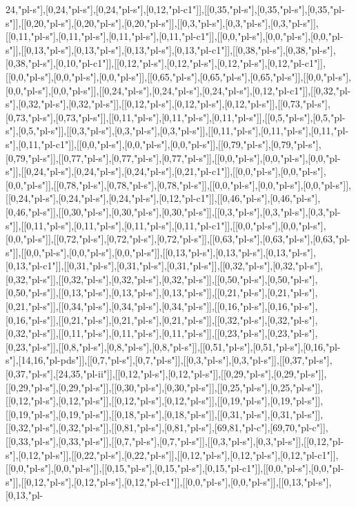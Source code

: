 24,"pl-s"],[0,24,"pl-s"],[0,24,"pl-s"],[0,12,"pl-c1"]],[[0,35,"pl-s"],[0,35,"pl-s"],[0,35,"pl-s"]],[[0,20,"pl-s"],[0,20,"pl-s"],[0,20,"pl-s"]],[[0,3,"pl-s"],[0,3,"pl-s"],[0,3,"pl-s"]],[[0,11,"pl-s"],[0,11,"pl-s"],[0,11,"pl-s"],[0,11,"pl-c1"]],[[0,0,"pl-s"],[0,0,"pl-s"],[0,0,"pl-s"]],[[0,13,"pl-s"],[0,13,"pl-s"],[0,13,"pl-s"],[0,13,"pl-c1"]],[[0,38,"pl-s"],[0,38,"pl-s"],[0,38,"pl-s"],[0,10,"pl-c1"]],[[0,12,"pl-s"],[0,12,"pl-s"],[0,12,"pl-s"],[0,12,"pl-c1"]],[[0,0,"pl-s"],[0,0,"pl-s"],[0,0,"pl-s"]],[[0,65,"pl-s"],[0,65,"pl-s"],[0,65,"pl-s"]],[[0,0,"pl-s"],[0,0,"pl-s"],[0,0,"pl-s"]],[[0,24,"pl-s"],[0,24,"pl-s"],[0,24,"pl-s"],[0,12,"pl-c1"]],[[0,32,"pl-s"],[0,32,"pl-s"],[0,32,"pl-s"]],[[0,12,"pl-s"],[0,12,"pl-s"],[0,12,"pl-s"]],[[0,73,"pl-s"],[0,73,"pl-s"],[0,73,"pl-s"]],[[0,11,"pl-s"],[0,11,"pl-s"],[0,11,"pl-s"]],[[0,5,"pl-s"],[0,5,"pl-s"],[0,5,"pl-s"]],[[0,3,"pl-s"],[0,3,"pl-s"],[0,3,"pl-s"]],[[0,11,"pl-s"],[0,11,"pl-s"],[0,11,"pl-s"],[0,11,"pl-c1"]],[[0,0,"pl-s"],[0,0,"pl-s"],[0,0,"pl-s"]],[[0,79,"pl-s"],[0,79,"pl-s"],[0,79,"pl-s"]],[[0,77,"pl-s"],[0,77,"pl-s"],[0,77,"pl-s"]],[[0,0,"pl-s"],[0,0,"pl-s"],[0,0,"pl-s"]],[[0,24,"pl-s"],[0,24,"pl-s"],[0,24,"pl-s"],[0,21,"pl-c1"]],[[0,0,"pl-s"],[0,0,"pl-s"],[0,0,"pl-s"]],[[0,78,"pl-s"],[0,78,"pl-s"],[0,78,"pl-s"]],[[0,0,"pl-s"],[0,0,"pl-s"],[0,0,"pl-s"]],[[0,24,"pl-s"],[0,24,"pl-s"],[0,24,"pl-s"],[0,12,"pl-c1"]],[[0,46,"pl-s"],[0,46,"pl-s"],[0,46,"pl-s"]],[[0,30,"pl-s"],[0,30,"pl-s"],[0,30,"pl-s"]],[[0,3,"pl-s"],[0,3,"pl-s"],[0,3,"pl-s"]],[[0,11,"pl-s"],[0,11,"pl-s"],[0,11,"pl-s"],[0,11,"pl-c1"]],[[0,0,"pl-s"],[0,0,"pl-s"],[0,0,"pl-s"]],[[0,72,"pl-s"],[0,72,"pl-s"],[0,72,"pl-s"]],[[0,63,"pl-s"],[0,63,"pl-s"],[0,63,"pl-s"]],[[0,0,"pl-s"],[0,0,"pl-s"],[0,0,"pl-s"]],[[0,13,"pl-s"],[0,13,"pl-s"],[0,13,"pl-s"],[0,13,"pl-c1"]],[[0,31,"pl-s"],[0,31,"pl-s"],[0,31,"pl-s"]],[[0,32,"pl-s"],[0,32,"pl-s"],[0,32,"pl-s"]],[[0,32,"pl-s"],[0,32,"pl-s"],[0,32,"pl-s"]],[[0,50,"pl-s"],[0,50,"pl-s"],[0,50,"pl-s"]],[[0,13,"pl-s"],[0,13,"pl-s"],[0,13,"pl-s"]],[[0,21,"pl-s"],[0,21,"pl-s"],[0,21,"pl-s"]],[[0,34,"pl-s"],[0,34,"pl-s"],[0,34,"pl-s"]],[[0,16,"pl-s"],[0,16,"pl-s"],[0,16,"pl-s"]],[[0,21,"pl-s"],[0,21,"pl-s"],[0,21,"pl-s"]],[[0,32,"pl-s"],[0,32,"pl-s"],[0,32,"pl-s"]],[[0,11,"pl-s"],[0,11,"pl-s"],[0,11,"pl-s"]],[[0,23,"pl-s"],[0,23,"pl-s"],[0,23,"pl-s"]],[[0,8,"pl-s"],[0,8,"pl-s"],[0,8,"pl-s"]],[[0,51,"pl-s"],[0,51,"pl-s"],[0,16,"pl-s"],[14,16,"pl-pds"]],[[0,7,"pl-s"],[0,7,"pl-s"]],[[0,3,"pl-s"],[0,3,"pl-s"]],[[0,37,"pl-s"],[0,37,"pl-s"],[24,35,"pl-ii"]],[[0,12,"pl-s"],[0,12,"pl-s"]],[[0,29,"pl-s"],[0,29,"pl-s"]],[[0,29,"pl-s"],[0,29,"pl-s"]],[[0,30,"pl-s"],[0,30,"pl-s"]],[[0,25,"pl-s"],[0,25,"pl-s"]],[[0,12,"pl-s"],[0,12,"pl-s"]],[[0,12,"pl-s"],[0,12,"pl-s"]],[[0,19,"pl-s"],[0,19,"pl-s"]],[[0,19,"pl-s"],[0,19,"pl-s"]],[[0,18,"pl-s"],[0,18,"pl-s"]],[[0,31,"pl-s"],[0,31,"pl-s"]],[[0,32,"pl-s"],[0,32,"pl-s"]],[[0,81,"pl-s"],[0,81,"pl-s"],[69,81,"pl-c"],[69,70,"pl-c"]],[[0,33,"pl-s"],[0,33,"pl-s"]],[[0,7,"pl-s"],[0,7,"pl-s"]],[[0,3,"pl-s"],[0,3,"pl-s"]],[[0,12,"pl-s"],[0,12,"pl-s"]],[[0,22,"pl-s"],[0,22,"pl-s"]],[[0,12,"pl-s"],[0,12,"pl-s"],[0,12,"pl-c1"]],[[0,0,"pl-s"],[0,0,"pl-s"]],[[0,15,"pl-s"],[0,15,"pl-s"],[0,15,"pl-c1"]],[[0,0,"pl-s"],[0,0,"pl-s"]],[[0,12,"pl-s"],[0,12,"pl-s"],[0,12,"pl-c1"]],[[0,0,"pl-s"],[0,0,"pl-s"]],[[0,13,"pl-s"],[0,13,"pl-